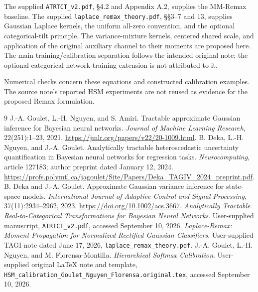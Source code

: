 \documentclass[letterpaper]{article}
\begin{document}
The supplied \nolinkurl{ATRTCT_v2.pdf}, \S4.2 and Appendix A.2, supplies the MM-Remax baseline. The supplied \nolinkurl{laplace_remax_theory.pdf}, \S\S3--7 and 13, supplies Gaussian Laplace kernels, the uniform all-zero convention, and the optional categorical-tilt principle. The variance-mixture kernels, centered shared scale, and application of the original auxiliary channel to their moments are proposed here. The main training/calibration separation follows the intended original note; the optional categorical network-training extension is not attributed to it.

Numerical checks concern these equations and constructed calibration examples. The source note's reported HSM experiments are not reused as evidence for the proposed Remax formulation.

\clearpage
\begin{thebibliography}{9}
J.-A. Goulet, L.-H. Nguyen, and S. Amiri.
\newblock Tractable approximate Gaussian inference for Bayesian neural networks.
\newblock \emph{Journal of Machine Learning Research}, 22(251):1--23, 2021.
\newblock \url{https://jmlr.org/papers/v22/20-1009.html}.
B. Deka, L.-H. Nguyen, and J.-A. Goulet.
\newblock Analytically tractable heteroscedastic uncertainty quantification in Bayesian neural networks for regression tasks.
\newblock \emph{Neurocomputing}, article 127183; author preprint dated January 12, 2024.
\newblock \url{https://profs.polymtl.ca/jagoulet/Site/Papers/Deka_TAGIV_2024_preprint.pdf}.
B. Deka and J.-A. Goulet.
\newblock Approximate Gaussian variance inference for state-space models.
\newblock \emph{International Journal of Adaptive Control and Signal Processing}, 37(11):2934--2962, 2023.
\newblock \url{https://doi.org/10.1002/acs.3667}.
\emph{Analytically Tractable Real-to-Categorical Transformations for Bayesian Neural Networks}.
\newblock User-supplied manuscript, \nolinkurl{ATRTCT_v2.pdf}, accessed September 10, 2026.
\emph{Laplace-Remax: Moment Propagation for Normalized Rectified Gaussian Classifiers}.
\newblock User-supplied TAGI note dated June 17, 2026, \nolinkurl{laplace_remax_theory.pdf}.
J.-A. Goulet, L.-H. Nguyen, and M. Florensa-Montilla.
\newblock \emph{Hierarchical Softmax Calibration}.
\newblock User-supplied original \LaTeX{} note and template, \nolinkurl{HSM_calibration_Goulet_Nguyen_Florensa.original.tex}, accessed September 10, 2026.
\end{thebibliography}
\end{document}
